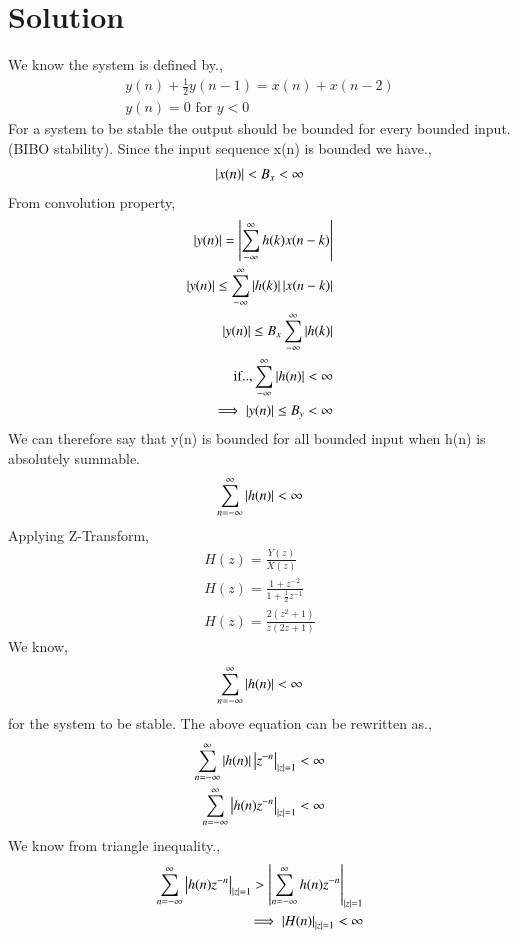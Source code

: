\documentclass[journal,12pt,twocolumn]{IEEEtran}
\begin{document}
\section{Solution}
We know the system is defined by.,
\begin{align}
\label{eq:system}
y(n)+\frac{1}{2}y(n-1) = x(n)+x(n-2) \\
y(n)=0 \text{ for }y<0
\end{align}
For a system to be stable the output should be bounded for every bounded input.(BIBO stability).
Since the input sequence x(n) is bounded we have.,
\begin{align}
    \left\vert x(n)\right\vert<B_x<\infty
\end{align}
From convolution property,
\begin{align}
 \left\vert y(n)\right\vert = \left\vert\sum_{-\infty}^{\infty}h(k)x(n-k)\right\vert\\
 \left\vert y(n)\right\vert \leq \sum_{-\infty}^{\infty}\left\vert h(k)\right\vert\left\vert x(n-k)\right\vert\\
 \left\vert y(n)\right\vert \leq B_x\sum_{-\infty}^{\infty}\left\vert h(k)\right\vert\\
 \text{if..,}
 \sum_{-\infty}^{\infty}\left\vert h(n)\right\vert < 
\infty \\
\implies \left\vert y(n)\right\vert \leq B_y < \infty 
\end{align}
We can therefore say that y(n) is bounded for all bounded input when h(n) is absolutely summable.\\
\begin{align}
\sum_{n=-\infty}^{\infty} \left\vert h(n)\right\vert < \infty
\end{align}
Applying Z-Transform, 
\begin{align}
H(z) = \frac{Y(z)}{X(z)}\\
H(z) = \frac{1+z^{-2}}{1+\frac{1}{2}z^{-1}}\\
H(z) = \frac{2(z^2+1)}{z(2z+1)} \label{eq:Z Transform}
\end{align}
We know,
\begin{align}
    \sum_{n=-\infty}^{\infty}\left\vert h(n)\right\vert<\infty
\end{align}
for the system to be stable.
The above equation can be rewritten as.,
\begin{align}
    \sum_{n=-\infty}^{\infty}\left\vert h(n)\right\vert\left\vert z^{-n}\right\vert_{\left\vert z\right\vert=1}<\infty\\
    \sum_{n=-\infty}^{\infty}\left\vert h(n)z^{-n}\right\vert_{\left\vert z\right\vert=1}<\infty
\end{align}
We know from triangle inequality.,
\begin{align}
   \sum_{n=-\infty}^{\infty}\left\vert h(n)z^{-n}\right\vert_{\left\vert z\right\vert=1}>\left\vert\sum_{n=-\infty}^{\infty}h(n)z^{-n}\right\vert_{\left\vert z\right\vert=1} \\
   \implies \left\vert H(n)\right\vert_{\left\vert z\right\vert=1}<\infty
\end{align}
\end{document}
